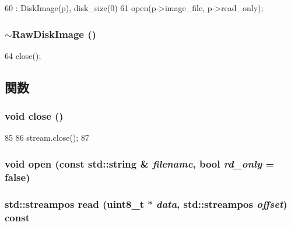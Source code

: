\begin{DoxyCode}
60     : DiskImage(p), disk_size(0)
61 { open(p->image_file, p->read_only); }
\end{DoxyCode}
\hypertarget{classRawDiskImage_a28b4c60baee37ef27cf858eeef06d632}{
\subsubsection[{$\sim$RawDiskImage}]{\setlength{\rightskip}{0pt plus 5cm}$\sim${\bf RawDiskImage} ()}}
\label{classRawDiskImage_a28b4c60baee37ef27cf858eeef06d632}



\begin{DoxyCode}
64 { close(); }
\end{DoxyCode}


\subsection{関数}
\hypertarget{classRawDiskImage_a5ae591df94fc66ccb85cbb6565368bca}{
\subsubsection[{close}]{\setlength{\rightskip}{0pt plus 5cm}void close ()}}
\label{classRawDiskImage_a5ae591df94fc66ccb85cbb6565368bca}



\begin{DoxyCode}
85 {
86     stream.close();
87 }
\end{DoxyCode}
\hypertarget{classRawDiskImage_ab55319ad8c062fa8b3b36096d8d62014}{
\subsubsection[{open}]{\setlength{\rightskip}{0pt plus 5cm}void open (const std::string \& {\em filename}, \/  bool {\em rd\_\-only} = {\ttfamily false})}}
\label{classRawDiskImage_ab55319ad8c062fa8b3b36096d8d62014}
\hypertarget{classRawDiskImage_ab2e0b5adfb9d2c78b1e534efa2af6e45}{
\subsubsection[{read}]{\setlength{\rightskip}{0pt plus 5cm}std::streampos read (uint8\_\-t $\ast$ {\em data}, \/  std::streampos {\em offset}) const}}
\label{classRawDiskImage_ab2e0b5adfb9d2c78b1e534efa2af6e45}



